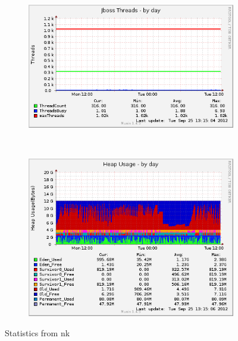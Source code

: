 \documentclass[10pt,a4paper]{article}
\begin{document}
\begin{figure}
        \centering
        \begin{subfigure}[b]{0.45\textwidth}
                \centering
                \includegraphics[width=\textwidth]{jboss_threads-day}
                \label{fig:jboss_threads-day}
        \end{subfigure}%
        ~ %
        \begin{subfigure}[b]{0.45\textwidth}
                \centering
                \includegraphics[width=\textwidth]{jstat__heap-day}
                \label{fig:jstat__heap-day}
        \end{subfigure}
        
        \caption{Statistics from nk}
        \label{fig:stats}
\end{figure}
\end{document}

